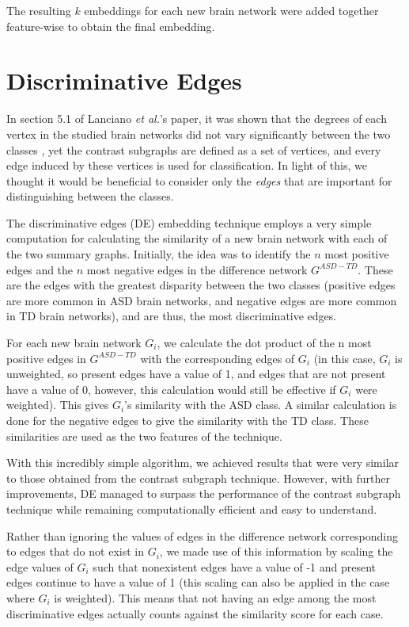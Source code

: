 \documentclass[sigconf]{acmart}
\begin{document}
The resulting $k$ embeddings for each new brain network were added together feature-wise to obtain the final embedding.



\section{Discriminative Edges}
In section 5.1 of Lanciano \emph{et al.}'s paper, it was shown that the degrees of each vertex in the studied brain networks did not vary significantly between the two classes \cite{lanciano2020}, yet the contrast subgraphs are defined as a set of vertices, and every edge induced by these vertices is used for classification.
In light of this, we thought it would be beneficial to consider only the \emph{edges} that are important for distinguishing between the classes.

The discriminative edges (DE) embedding technique employs a very simple computation for calculating the similarity of a new brain network with each of the two summary graphs.
Initially, the idea was to identify the $n$ most positive edges and the $n$ most negative edges in the difference network $G^{ASD - TD}$.
These are the edges with the greatest disparity between the two classes (positive edges are more common in ASD brain networks, and negative edges are more common in TD brain networks), and are thus, the most discriminative edges.

For each new brain network $G_i$, we calculate the dot product of the n most positive edges in $G^{ASD - TD}$ with the corresponding edges of $G_i$ (in this case, $G_i$ is unweighted, so present edges have a value of 1, and edges that are not present have a value of 0, however, this calculation would still be effective if $G_i$ were weighted).
This gives $G_i$'s similarity with the ASD class.
A similar calculation is done for the negative edges to give the similarity with the TD class.
These similarities are used as the two features of the technique.

With this incredibly simple algorithm, we achieved results that were very similar to those obtained from the contrast subgraph technique.
However, with further improvements, DE managed to surpass the performance of the contrast subgraph technique while remaining computationally efficient and easy to understand.

Rather than ignoring the values of edges in the difference network corresponding to edges that do not exist in $G_i$, we made use of this information by scaling the edge values of $G_i$ such that nonexistent edges have a value of -1 and present edges continue to have a value of 1 (this scaling can also be applied in the case where $G_i$ is weighted).
This means that not having an edge among the most discriminative edges actually counts against the similarity score for each case.
\end{document}
